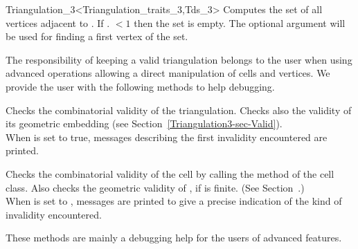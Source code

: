 \begin{ccRefClass}{Triangulation_3<Triangulation_traits_3,Tds_3>}
{Computes the set  of all vertices adjacent to . If
\ccVar. $<1$ then the set is empty. The optional
argument  will be used for finding a first vertex of the set.
}


\begin{ccAdvanced}
The responsibility of keeping a valid triangulation belongs to the user
when using advanced operations allowing a direct manipulation of cells
and vertices. We provide the user with the following methods to help
debugging. 

{Checks the combinatorial validity of the triangulation. Checks also the
validity of its geometric embedding (see
Section~\ref{Triangulation3-sec-Valid}).\\ When  is set to true, 
messages describing the first invalidity encountered are printed.}

{Checks the combinatorial validity of the cell by calling the
 method of the  cell class. Also checks the
geometric validity of , if  is finite. (See
Section~\pageref{Triangulation3-sec-Valid}.)\\ 
When  is set to , messages are printed to give
a precise indication of the kind of invalidity encountered.}

These methods are mainly a debugging help for the users of advanced features.


\end{ccAdvanced}
\end{ccRefClass}
